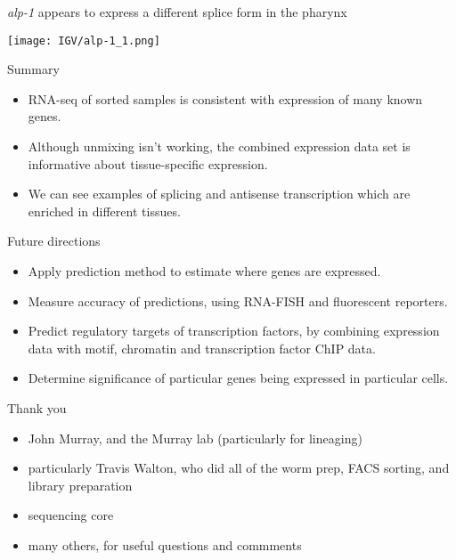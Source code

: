 \documentclass[serif,9pt]{beamer}
\begin{document}
\begin{frame}{{\em alp-1} appears to express a different splice form in the pharynx}
\begin{center}
\texttt{[image: IGV/alp-1\_1.png]}
\end{center} 
\end{frame}

\begin{frame}{Summary}

\begin{itemize}

\item RNA-seq of sorted samples is consistent with
expression of many known genes.

\item Although unmixing isn't working, the combined expression data
set is informative about tissue-specific expression.

\item We can see examples of splicing and antisense transcription
which are enriched in different tissues.

\end{itemize}

\end{frame}

\begin{frame}{Future directions}

\begin{itemize}

\item Apply prediction method to estimate where genes are expressed.

\item Measure accuracy of predictions, using RNA-FISH and fluorescent reporters.

\item Predict regulatory targets of transcription factors, by combining
expression data with motif, chromatin and transcription factor ChIP data.

\item Determine significance of particular genes being expressed in particular cells.

\end{itemize}

\end{frame}



\begin{frame}{Thank you}

\begin{itemize}

\item John Murray, and the Murray lab (particularly for lineaging)

\item particularly Travis Walton, who did all of the worm prep, FACS sorting,
and library preparation

\item sequencing core

\item many others, for useful questions and commments

\end{itemize}

\end{frame}
\end{document}
